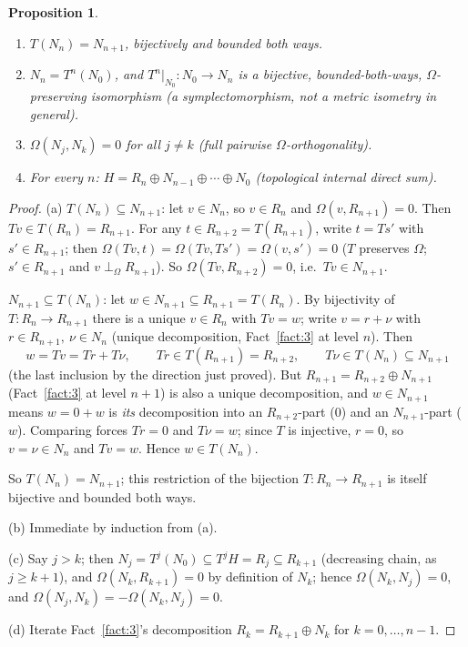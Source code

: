 \documentclass[11pt,a4paper]{article}
\newtheorem{proposition}[theorem]{Proposition}
\theoremstyle{definition}
\theoremstyle{remark}
\newcommand{\Om}{\Omega}
\newcommand{\pO}{\perp_\Omega}
\begin{document}
\begin{proposition}
\label{prop:Nfiltration}
\begin{enumerate}[label=(\alph*)]
\item $T(N_n)=N_{n+1}$, bijectively and bounded both ways.
\item $N_n=T^n(N_0)$, and $T^n|_{N_0}:N_0\to N_n$ is a bijective, bounded-both-ways,
$\Om$-preserving isomorphism (a symplectomorphism, not a metric isometry in general).
\item $\Om(N_j,N_k)=0$ for all $j\ne k$ (full pairwise $\Om$-orthogonality).
\item For every $n$: $H=R_n\oplus N_{n-1}\oplus\cdots\oplus N_0$ (topological internal
direct sum).
\end{enumerate}
\end{proposition}
\begin{proof}
(a) \emph{$T(N_n)\subseteq N_{n+1}$}: let $v\in N_n$, so $v\in R_n$ and $\Om(v,R_{n+1})=0$.
Then $Tv\in T(R_n)=R_{n+1}$. For any $t\in R_{n+2}=T(R_{n+1})$, write $t=Ts'$ with
$s'\in R_{n+1}$; then $\Om(Tv,t)=\Om(Tv,Ts')=\Om(v,s')=0$ ($T$ preserves $\Om$; $s'\in R_{n+1}$
and $v\pO R_{n+1}$). So $\Om(Tv,R_{n+2})=0$, i.e.\ $Tv\in N_{n+1}$.

\emph{$N_{n+1}\subseteq T(N_n)$}: let $w\in N_{n+1}\subseteq R_{n+1}=T(R_n)$. By bijectivity
of $T:R_n\to R_{n+1}$ there is a unique $v\in R_n$ with $Tv=w$; write $v=r+\nu$ with
$r\in R_{n+1},\ \nu\in N_n$ (unique decomposition, Fact~\ref{fact:3} at level $n$). Then
\[
w=Tv=Tr+T\nu,\qquad Tr\in T(R_{n+1})=R_{n+2},\qquad T\nu\in T(N_n)\subseteq N_{n+1}
\]
(the last inclusion by the direction just proved). But $R_{n+1}=R_{n+2}\oplus N_{n+1}$
(Fact~\ref{fact:3} at level $n{+}1$) is also a unique decomposition, and $w\in N_{n+1}$
means $w=0+w$ is \emph{its} decomposition into an $R_{n+2}$-part ($0$) and an $N_{n+1}$-part
($w$). Comparing forces $Tr=0$ and $T\nu=w$; since $T$ is injective, $r=0$, so
$v=\nu\in N_n$ and $Tv=w$. Hence $w\in T(N_n)$.

So $T(N_n)=N_{n+1}$; this restriction of the bijection $T:R_n\to R_{n+1}$ is itself
bijective and bounded both ways.

(b) Immediate by induction from (a).

(c) Say $j>k$; then $N_j=T^j(N_0)\subseteq T^jH=R_j\subseteq R_{k+1}$ (decreasing chain, as
$j\ge k+1$), and $\Om(N_k,R_{k+1})=0$ by definition of $N_k$; hence $\Om(N_k,N_j)=0$, and
$\Om(N_j,N_k)=-\Om(N_k,N_j)=0$.

(d) Iterate Fact~\ref{fact:3}'s decomposition $R_k=R_{k+1}\oplus N_k$ for $k=0,\dots,n-1$.
\end{proof}
\end{document}
